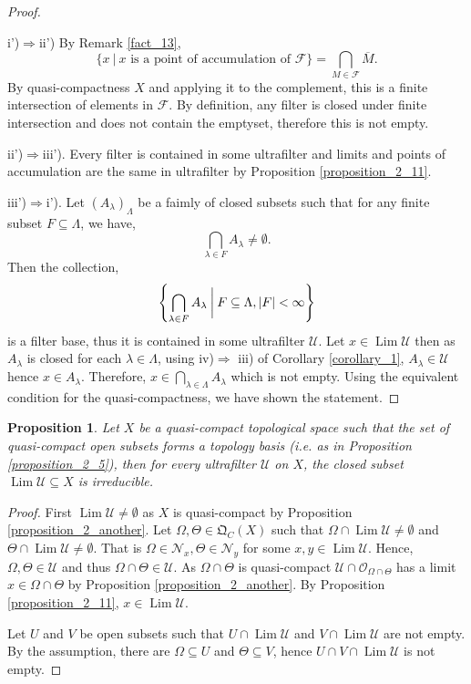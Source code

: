 \documentclass[8pt]{article}
\numberwithin{equation}{section}
\newtheorem{proposition}{Proposition}[subsection]
\DeclareMathOperator{\Lim}{Lim}
\newcommand{\Ouv}{\mathscr{O}}
\newcommand{\F}[0]{\mathcal{F}}
\newcommand{\U}[0]{\mathcal{U}}
\newcommand{\sep}[0]{\:|\:}
\newcommand{\Nfil}[0]{\mathcal{N}}
\newcommand{\QC}[0]{\mathfrak{Q}_C}
\begin{document}
\begin{proof}$\:$
    \par i')$\Rightarrow$ii') By Remark \ref{fact_13},
    \begin{equation*}
        \{x\sep x\text{ is a point of accumulation of $\F$}\} = \bigcap_{M\in\F}\overline{M}.
    \end{equation*}
    By quasi-compactness $X$ and applying it to the complement, this is a finite intersection of elements in $\F$. By definition, any filter is closed under finite intersection and does not contain the emptyset, therefore this is not empty.
    \par ii')$\Rightarrow$iii'). Every filter is contained in some ultrafilter and limits and points of accumulation are the same in ultrafilter by Proposition \ref{proposition_2_11}.
    \par iii')$\Rightarrow$i'). Let $(A_\lambda)_\Lambda$ be a faimly of closed subsets such that for any finite subset $F\subseteq\Lambda$, we have,
    \begin{equation*}
        \bigcap_{\lambda\in F}A_\lambda\not=\emptyset.
    \end{equation*}
    Then the collection,
    \begin{equation*}
        \left\{\bigcap_{\lambda\in F}A_\lambda\:\bigg{|}\: F\subseteq\Lambda,\vert F\vert<\infty\right\}
    \end{equation*}
    is a filter base, thus it is contained in some ultrafilter $\U$. Let $x\in\Lim\U$ then as $A_\lambda$ is closed for each $\lambda\in \Lambda$, using iv)$\Rightarrow$ iii) of Corollary \ref{corollary_1}, $A_\lambda\in\U$ hence $x\in A_\lambda$. Therefore, $x\in\bigcap_{\lambda\in\Lambda}A_\lambda$ which is not empty.
    Using the equivalent condition for the quasi-compactness, we have shown the statement. 
\end{proof}
\begin{proposition}
    \label{proposition_3}
    Let $X$ be a quasi-compact topological space such that the set of quasi-compact open subsets forms a topology basis (i.e. as in Proposition \ref{proposition_2_5}), then for every ultrafilter $\U$ on $X$, the closed subset $\Lim\U\subseteq X$ is irreducible. 
\end{proposition}
\begin{proof}
    First $\Lim\U\not=\emptyset$ as $X$ is quasi-compact by Proposition \ref{proposition_2_another}. Let $\Omega,\Theta\in\QC(X)$ such that $\Omega\cap \Lim\U\not=\emptyset$ and $\Theta\cap\Lim\U\not=\emptyset$. That is $\Omega\in\Nfil_x,\Theta\in\Nfil_y$ for some $x,y\in\Lim\U$. Hence, $\Omega,\Theta\in\U$ and thus $\Omega\cap\Theta\in\U$.
    As $\Omega\cap\Theta$ is quasi-compact $\U\cap\Ouv_{\Omega\cap\Theta}$ has a limit $x\in\Omega\cap\Theta$ by Proposition \ref{proposition_2_another}. By Proposition \ref{proposition_2_11}, $x\in\Lim\U$. 
    \par Let $U$ and $V$ be open subsets such that $U\cap\Lim\U$ and $V\cap\Lim\U$ are not empty. By the assumption, there are $\Omega\subseteq U$ and $\Theta\subseteq V$, hence $U\cap V\cap\Lim\U$ is not empty.
\end{proof}
\end{document}
